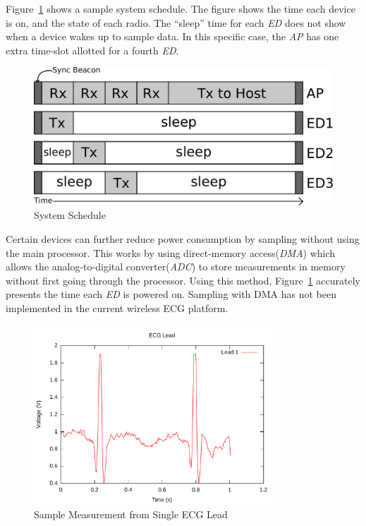 \documentclass{article}
\begin{document}
Figure~\ref{fig:system_schedule} shows a sample system schedule. The figure shows the time each device is on, and the state of each radio. The ``sleep'' time for each \emph{ED} does not show when a device wakes up to sample data. In this specific case, the \emph{AP} has one extra time-slot allotted for a fourth \emph{ED}.

\begin{figure}[htb]
\begin{center}
\includegraphics[width=1\textwidth]{figures/sync_schedule.pdf}
\end{center}
\caption{System Schedule}
\label{fig:system_schedule}
\end{figure}

Certain devices can further reduce power consumption by sampling without using the main processor. This works by using direct-memory access(\emph{DMA}) which allows the analog-to-digital converter(\emph{ADC}) to store measurements in memory without first going through the processor. Using this method, Figure~\ref{fig:system_schedule} accurately presents the time each \emph{ED} is powered on. Sampling with DMA has not been implemented in the current wireless ECG platform.

\begin{figure}[htb]
\begin{center}
\includegraphics[width=0.8\textwidth]{figures/heartbeats.pdf}
\end{center}
\caption{Sample Measurement from Single ECG Lead}
\label{fig:heartbeats}
\end{figure}
\end{document}
